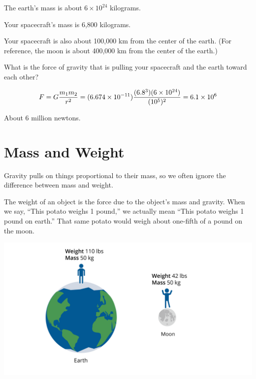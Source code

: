 \begin{Exercise}[title={Gravity}, label=gravity_earth]
  
  The earth's mass is about $6 \times 10^{24}$ kilograms.

  Your spacecraft's mass is 6,800 kilograms.

  Your spacecraft is also about 100,000 km from the center of the earth. (For reference, the moon is about 400,000 km from the center of the earth.)

  What is the force of gravity that is pulling your spacecraft and the earth toward each other?

\end{Exercise}
\begin{Answer}[ref=gravity_earth]

  $$F = G\frac{m_1 m_2}{r^2} = (6.674 \times 10^{-11})\frac{(6.8 \time 10^3)(6 \times 10^{24})}{(10^5)^2} = 6.1 \times 10^{6}$$

  About 6 million newtons.
  
\end{Answer}

\section{Mass and Weight}

Gravity pulls on things proportional to their mass, so we often
ignore the difference between mass and weight.

The weight of an object is the force due to the object's mass and
gravity.  When we say, ``This potato weighs 1 pound,'' we actually mean
``This potato weighs 1 pound on earth.''  That same potato would weigh
about one-fifth of a pound on the moon.

\includegraphics[width=1\textwidth]{massvweight.png}

